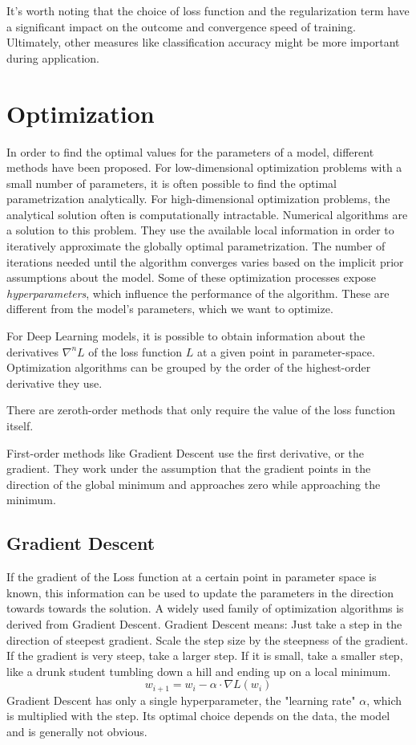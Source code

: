 \documentclass[twoside,12pt,a4paper]{report}
\begin{document}
It's worth noting that the choice of loss function and the regularization term have a significant impact on the outcome and convergence speed of training. Ultimately, other measures like classification accuracy might be more important during application.

\section{Optimization}
In order to find the optimal values for the parameters of a model, different methods have been proposed. For low-dimensional optimization problems with a small number of parameters, it is often possible to find the optimal parametrization analytically. For high-dimensional optimization problems, the analytical solution often is computationally intractable. Numerical algorithms are a solution to this problem.
They use the available local information in order to iteratively approximate the globally optimal parametrization. The number of iterations needed until the algorithm converges varies based on the implicit prior assumptions about the model.
Some of these optimization processes expose \textit{hyperparameters}, which influence the performance of the algorithm. These are different from the model's parameters, which we want to optimize.

For Deep Learning models, it is possible to obtain information about the derivatives $\nabla ^n L$ of the loss function $L$ at a given point in parameter-space. Optimization algorithms can be grouped by the order of the highest-order derivative they use.

There are zeroth-order methods that only require the value of the loss function itself.

First-order methods like Gradient Descent use the first derivative, or the gradient. They work under the assumption that the gradient points in the direction of the global minimum and approaches zero while approaching the minimum.

\subsection{Gradient Descent}
If the gradient of the Loss function at a certain point in parameter space is known, this information can be used to update the parameters in the direction towards towards the solution. A widely used family of optimization algorithms is derived from Gradient Descent. Gradient Descent means: Just take a step in the direction of steepest gradient. Scale the step size by the steepness of the gradient. If the gradient is very steep, take a larger step. If it is small, take a smaller step, like a drunk student tumbling down a hill and ending up on a local minimum.
$$w_{i+1} = w_i - \alpha \cdot \nabla L(w_i) $$
Gradient Descent has only a single hyperparameter, the "learning rate" $\alpha$, which is multiplied with the step. Its optimal choice depends on the data, the model and is generally not obvious.
\end{document}
